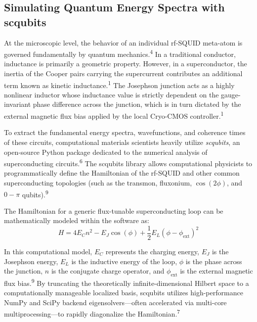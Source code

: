 \documentclass[11pt, a4paper]{article}
\begin{document}
\subsection{Simulating Quantum Energy Spectra with scqubits}

At the microscopic level, the behavior of an individual rf-SQUID meta-atom is governed fundamentally by quantum mechanics.\textsuperscript{4} In a traditional conductor, inductance is primarily a geometric property. However, in a superconductor, the inertia of the Cooper pairs carrying the supercurrent contributes an additional term known as kinetic inductance.\textsuperscript{1} The Josephson junction acts as a highly nonlinear inductor whose inductance value is strictly dependent on the gauge-invariant phase difference across the junction, which is in turn dictated by the external magnetic flux bias applied by the local Cryo-CMOS controller.\textsuperscript{1}

To extract the fundamental energy spectra, wavefunctions, and coherence times of these circuits, computational materials scientists heavily utilize \textit{scqubits}, an open-source Python package dedicated to the numerical analysis of superconducting circuits.\textsuperscript{6} The scqubits library allows computational physicists to programmatically define the Hamiltonian of the rf-SQUID and other common superconducting topologies (such as the transmon, fluxonium, $\cos(2\phi)$, and $0-\pi$ qubits).\textsuperscript{9}

The Hamiltonian for a generic flux-tunable superconducting loop can be mathematically modeled within the software as:
\begin{equation}
H = 4E_C n^2 - E_J \cos(\phi) + \frac{1}{2} E_L(\phi - \phi_{\text{ext}})^2
\end{equation}

In this computational model, $E_C$ represents the charging energy, $E_J$ is the Josephson energy, $E_L$ is the inductive energy of the loop, $\phi$ is the phase across the junction, $n$ is the conjugate charge operator, and $\phi_{\text{ext}}$ is the external magnetic flux bias.\textsuperscript{9} By truncating the theoretically infinite-dimensional Hilbert space to a computationally manageable localized basis, scqubits utilizes high-performance NumPy and SciPy backend eigensolvers---often accelerated via multi-core multiprocessing---to rapidly diagonalize the Hamiltonian.\textsuperscript{7}
\end{document}
